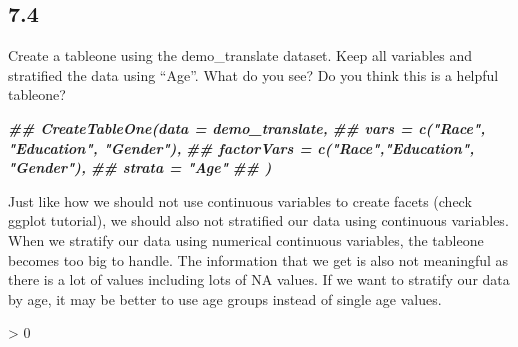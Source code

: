 \documentclass[
]{book}
\newenvironment{Shaded}{\begin{snugshade}}{\end{snugshade}}
\newcommand{\DocumentationTok}[1]{\textcolor[rgb]{0.56,0.35,0.01}{\textbf{\textit{#1}}}}
\newlength{\cslhangindent}
\newenvironment{CSLReferences}[2] %
 {%
  \setlength{\parindent}{0pt}
  \ifodd #1 \everypar{\setlength{\hangindent}{\cslhangindent}}\ignorespaces\fi
  \ifnum #2 > 0
  \setlength{\parskip}{#2\baselineskip}
  \fi
 }%
 {}
\begin{document}
\hypertarget{section-41}{%
\subsection{7.4}\label{section-41}}

Create a tableone using the demo\_translate dataset. Keep all variables and stratified the data using ``Age''. What do you see? Do you think this is a helpful tableone?

\begin{Shaded}
\begin{Highlighting}[]
\DocumentationTok{\#\# CreateTableOne(data = demo\_translate,}
\DocumentationTok{\#\#               vars = c("Race", "Education", "Gender"),}
\DocumentationTok{\#\#               factorVars = c("Race","Education", "Gender"),}
\DocumentationTok{\#\#               strata = "Age"}
\DocumentationTok{\#\#              )}
\end{Highlighting}
\end{Shaded}

Just like how we should not use continuous variables to create facets (check ggplot tutorial), we should also not stratified our data using continuous variables. When we stratify our data using numerical continuous variables, the tableone becomes too big to handle. The information that we get is also not meaningful as there is a lot of values including lots of NA values. If we want to stratify our data by age, it may be better to use age groups instead of single age values.

\hypertarget{refs}{}
\begin{CSLReferences}{0}{0}
\end{CSLReferences}

  
\end{document}
